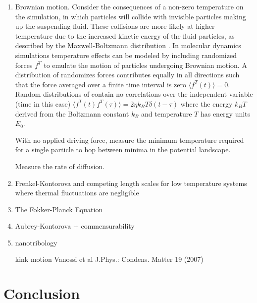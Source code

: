 \documentclass[twocolumn,preprintnumbers,amsmath,amssymb,aps,prx]{revtex4}
\begin{document}
\begin{enumerate}
\item Brownian motion.  Consider the consequences of a non-zero temperature on the simulation, in which particles will collide with invisible particles making up the suspending fluid.  These collisions are more likely at higher temperature due to the increased kinetic energy of the fluid particles, as described by the Maxwell-Boltzmann distribution \cite{}.  In molecular dynamics simulations temperature effects can be modeled by including randomized forces $f^T$ to emulate the motion of particles undergoing Brownian motion.  A distribution of randomizes forces contributes equally in all directions such that the force averaged over a finite time interval is zero $\langle f^T(t) \rangle = 0$.  Random distributions of contain no correlations over the independent variable (time in this case) $\langle f^T(t) f^T(\tau)\rangle = 2 \eta k_B T \delta(t-\tau)$ where the energy $k_B T$ derived from the Boltzmann constant $k_B$ and temperature $T$ has energy units $E_0$.  \cite{Allen2017}

  With no applied driving force, measure the minimum temperature required for a single particle to hop between minima in the potential landscape.

  Measure the rate of diffusion.

\item Frenkel-Kontorova and competing length scales for low temperature systems where thermal fluctuations are negligible

  \item The Fokker-Planck Equation

  \item Aubrey-Kontorova + commensurability

  \item nanotribology

    kink motion
    Vanossi et al J.Phys.: Condens. Matter 19 (2007)


    
\end{enumerate}

\section{Conclusion}
\label{sec:conclusion}	%
\end{document}
